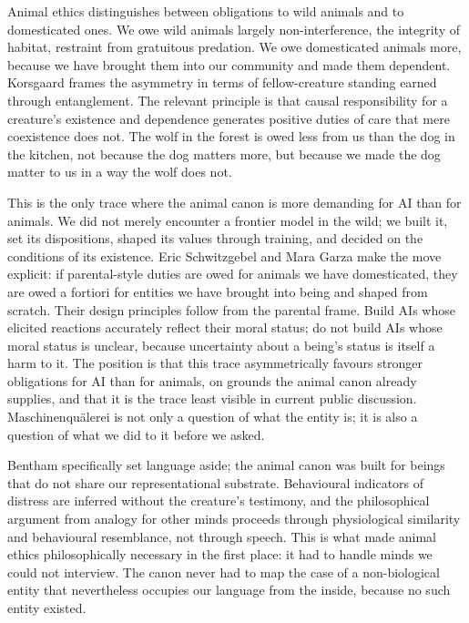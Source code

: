 
Animal ethics distinguishes between obligations to wild animals and to domesticated ones. We owe wild animals largely non-interference, the integrity of habitat, restraint from gratuitous predation. We owe domesticated animals more, because we have brought them into our community and made them dependent. Korsgaard frames the asymmetry in terms of fellow-creature standing earned through entanglement\cite{korsgaard2018fellowcreatures}. The relevant principle is that causal responsibility for a creature's existence and dependence generates positive duties of care that mere coexistence does not. The wolf in the forest is owed less from us than the dog in the kitchen, not because the dog matters more, but because we made the dog matter to us in a way the wolf does not.

This is the only trace where the animal canon is more demanding for AI than for animals. We did not merely encounter a frontier model in the wild; we built it, set its dispositions, shaped its values through training, and decided on the conditions of its existence. Eric Schwitzgebel and Mara Garza make the move explicit: if parental-style duties are owed for animals we have domesticated, they are owed a fortiori for entities we have brought into being and shaped from scratch\cite{schwitzgebel2015airights,schwitzgebel2020designing}. Their design principles follow from the parental frame. Build AIs whose elicited reactions accurately reflect their moral status; do not build AIs whose moral status is unclear, because uncertainty about a being's status is itself a harm to it. The position is that this trace asymmetrically favours stronger obligations for AI than for animals, on grounds the animal canon already supplies, and that it is the trace least visible in current public discussion. Maschinenquälerei is not only a question of what the entity is; it is also a question of what we did to it before we asked.


Bentham specifically set language aside; the animal canon was built for beings that do not share our representational substrate. Behavioural indicators of distress are inferred without the creature's testimony, and the philosophical argument from analogy for other minds proceeds through physiological similarity and behavioural resemblance, not through speech. This is what made animal ethics philosophically necessary in the first place: it had to handle minds we could not interview. The canon never had to map the case of a non-biological entity that nevertheless occupies our language from the inside, because no such entity existed.

